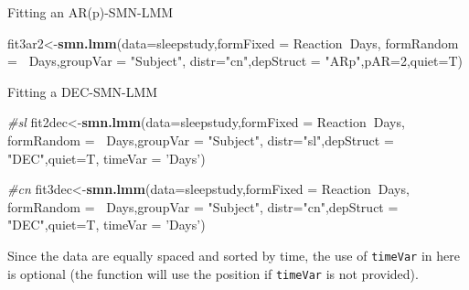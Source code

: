 \documentclass[
  ignorenonframetext,
]{beamer}
\newenvironment{Shaded}{\begin{snugshade}}{\end{snugshade}}
\newcommand{\CommentTok}[1]{\textcolor[rgb]{0.56,0.35,0.01}{\textit{#1}}}
\newcommand{\DataTypeTok}[1]{\textcolor[rgb]{0.13,0.29,0.53}{#1}}
\newcommand{\DecValTok}[1]{\textcolor[rgb]{0.00,0.00,0.81}{#1}}
\newcommand{\KeywordTok}[1]{\textcolor[rgb]{0.13,0.29,0.53}{\textbf{#1}}}
\newcommand{\NormalTok}[1]{#1}
\newcommand{\OperatorTok}[1]{\textcolor[rgb]{0.81,0.36,0.00}{\textbf{#1}}}
\newcommand{\StringTok}[1]{\textcolor[rgb]{0.31,0.60,0.02}{#1}}
\begin{document}
\begin{frame}[fragile]{Fitting an AR(p)-SMN-LMM}
\begin{Shaded}
\begin{Highlighting}[]
\NormalTok{fit3ar2<-}\KeywordTok{smn.lmm}\NormalTok{(}\DataTypeTok{data=}\NormalTok{sleepstudy,}\DataTypeTok{formFixed =}\NormalTok{ Reaction}\OperatorTok{~}\NormalTok{Days,}
                 \DataTypeTok{formRandom =} \OperatorTok{~}\NormalTok{Days,}\DataTypeTok{groupVar =} \StringTok{"Subject"}\NormalTok{,}
                 \DataTypeTok{distr=}\StringTok{"cn"}\NormalTok{,}\DataTypeTok{depStruct =} \StringTok{"ARp"}\NormalTok{,}\DataTypeTok{pAR=}\DecValTok{2}\NormalTok{,}\DataTypeTok{quiet=}\NormalTok{T)}
\end{Highlighting}
\end{Shaded}

\end{frame}

\begin{frame}[fragile]{Fitting a DEC-SMN-LMM}
\protect\hypertarget{fitting-a-dec-smn-lmm}{}

\small

\begin{Shaded}
\begin{Highlighting}[]
\CommentTok{#sl}
\NormalTok{fit2dec<-}\KeywordTok{smn.lmm}\NormalTok{(}\DataTypeTok{data=}\NormalTok{sleepstudy,}\DataTypeTok{formFixed =}\NormalTok{ Reaction}\OperatorTok{~}\NormalTok{Days,}
                 \DataTypeTok{formRandom =} \OperatorTok{~}\NormalTok{Days,}\DataTypeTok{groupVar =} \StringTok{"Subject"}\NormalTok{,}
                 \DataTypeTok{distr=}\StringTok{"sl"}\NormalTok{,}\DataTypeTok{depStruct =} \StringTok{"DEC"}\NormalTok{,}\DataTypeTok{quiet=}\NormalTok{T,}
                 \DataTypeTok{timeVar =} \StringTok{'Days'}\NormalTok{)}
\end{Highlighting}
\end{Shaded}

\begin{Shaded}
\begin{Highlighting}[]
\CommentTok{#cn}
\NormalTok{fit3dec<-}\KeywordTok{smn.lmm}\NormalTok{(}\DataTypeTok{data=}\NormalTok{sleepstudy,}\DataTypeTok{formFixed =}\NormalTok{ Reaction}\OperatorTok{~}\NormalTok{Days,}
                 \DataTypeTok{formRandom =} \OperatorTok{~}\NormalTok{Days,}\DataTypeTok{groupVar =} \StringTok{"Subject"}\NormalTok{,}
                 \DataTypeTok{distr=}\StringTok{"cn"}\NormalTok{,}\DataTypeTok{depStruct =} \StringTok{"DEC"}\NormalTok{,}\DataTypeTok{quiet=}\NormalTok{T,}
                 \DataTypeTok{timeVar =} \StringTok{'Days'}\NormalTok{)}
\end{Highlighting}
\end{Shaded}

Since the data are equally spaced and sorted by time, the use of
\texttt{timeVar} in here is optional (the function will use the position
if \texttt{timeVar} is not provided).

\end{frame}
\end{document}
